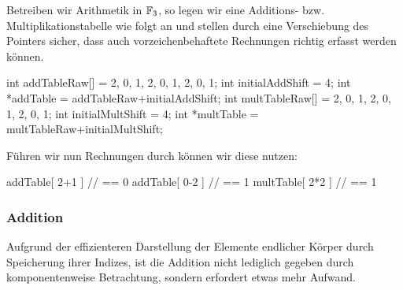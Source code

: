 \begin{beispiel}
  Betreiben wir Arithmetik in $\mathbb{F}_3$, so legen wir eine Additions- bzw.
  Multiplikationstabelle wie folgt an und stellen durch eine Verschiebung des
  Pointers sicher, dass auch vorzeichenbehaftete Rechnungen richtig erfasst
  werden können.
  \begin{cexample}
    int addTableRaw[] = {2, 0, 1, 2, 0, 1, 2, 0, 1};
    int initialAddShift = 4;
    int *addTable = addTableRaw+initialAddShift;
    int multTableRaw[] = {2, 0, 1, 2, 0, 1, 2, 0, 1};
    int initialMultShift = 4;
    int *multTable = multTableRaw+initialMultShift;
  \end{cexample}
  Führen wir nun Rechnungen durch können wir diese nutzen:
  \begin{cexample}
    addTable[ 2+1 ]  // == 0 
    addTable[ 0-2 ]  // == 1
    multTable[ 2*2 ]  // == 1
  \end{cexample}
\end{beispiel}


\subsubsection{Addition}
Aufgrund der effizienteren Darstellung der Elemente endlicher Körper durch
Speicherung ihrer Indizes, ist die Addition nicht lediglich gegeben durch
komponentenweise Betrachtung, sondern erfordert etwas mehr Aufwand.

